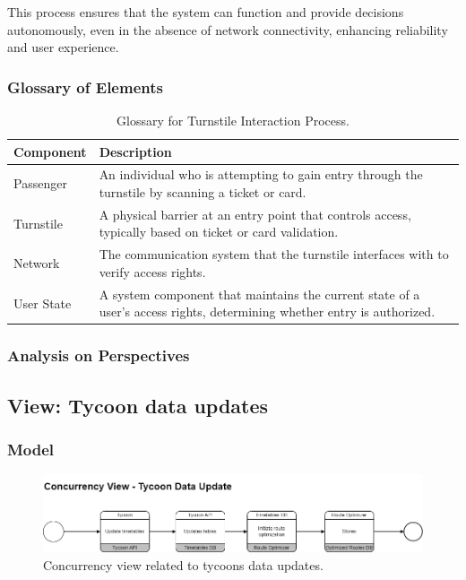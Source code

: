 This process ensures that the system can function and provide decisions autonomously, even in the absence of network connectivity, enhancing reliability and user experience.

\subsubsection{Glossary of Elements}

\begin{table}[H]
    \centering
    \caption{Glossary for Turnstile Interaction Process.}
    \label{tab:turnstile_interaction_glossary}
    \begin{tabularx}{\textwidth}{@{}lX@{}} %
    \toprule
    \textbf{Component} & \textbf{Description} \\
    \midrule
    Passenger & An individual who is attempting to gain entry through the turnstile by scanning a ticket or card. \\
    Turnstile & A physical barrier at an entry point that controls access, typically based on ticket or card validation. \\
    Network & The communication system that the turnstile interfaces with to verify access rights. \\
    User State & A system component that maintains the current state of a user's access rights, determining whether entry is authorized. \\
    \bottomrule
    \end{tabularx}
\end{table}
\subsubsection{Analysis on Perspectives}
\subsection{View: Tycoon data updates}
\subsubsection{Model}

\begin{figure}[H]
    \centering
    \includegraphics[width=\textwidth]{drawings/views_final_version/concurrency_view_3.png}
    \caption{Concurrency view related to tycoons data updates.}
    \label{fig:concurrency_view_3}
\end{figure}

